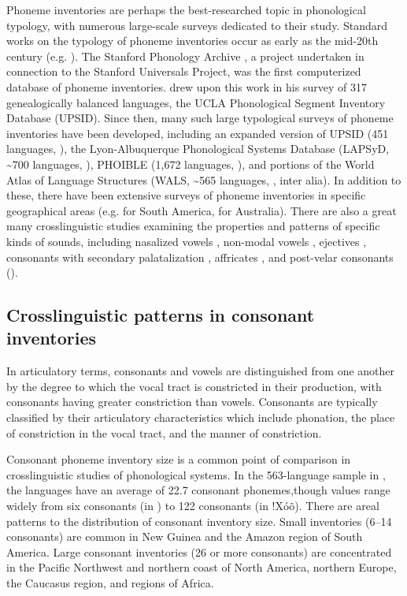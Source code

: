   Phoneme inventories are perhaps the best-researched topic in phonological typology, with numerous large-scale surveys dedicated to their study. Standard works on the typology of phoneme inventories occur as early as the mid-20th century (e.g. \citealt{Hockett1955}). The Stanford Phonology Archive \citep{CrothersEtAl1979}, a project undertaken in connection to the Stanford Universals Project, was the first computerized database of phoneme inventories. \citet{Maddieson1984} drew upon this work in his survey of 317 genealogically balanced languages, the UCLA Phonological Segment Inventory Database (UPSID). Since then, many such large typological surveys of phoneme inventories have been developed, including an expanded version of UPSID (451 languages, \citealt{MaddiesonPrecoda1992}), the Lyon-Albuquerque Phonological Systems Database (LAPSyD, {\textasciitilde}700 languages, \citealt{MaddiesonEtAl2013}), PHOIBLE (1,672 languages, \citealt{MoranEtAl2014}), and portions of the World Atlas of Language Structures (WALS, {\textasciitilde}565 languages, \citealt{Maddieson2013b,Maddieson2013c}, inter alia). In addition to these, there have been extensive surveys of phoneme inventories in specific geographical areas (e.g. \citealt{MichaelEtAl2015} for South America, \citealt{GasserBowern2014} for Australia). There are also a great many crosslinguistic studies examining the properties and patterns of specific kinds of sounds, including nasalized vowels \citep{Hajek2013}, non-modal vowels \citep{Gordon1998}, ejectives \citep{Fallon2002}, consonants with secondary palatalization \citep{Hall2000}, affricates \citep{Berns2013}, and post-velar consonants (\citealt{Sylak-Glassman2014}). 

\subsection{Crosslinguistic patterns in consonant inventories}\label{sec:4.1.1}

  In articulatory terms, consonants and vowels are distinguished from one another by the degree to which the vocal tract is constricted in their production, with consonants having greater constriction than vowels. Consonants are typically classified by their articulatory characteristics which include phonation, the place of constriction in the vocal tract, and the manner of constriction.

  Consonant phoneme inventory size is a common point of comparison in cross\-linguistic studies of phonological systems. In the 563-language sample in \citet{Maddieson2013b}, the languages have an average of 22.7 consonant phonemes,\linebreak though values range widely from six consonants (in ) to 122 consonants (in !Xóõ). There are areal patterns to the distribution of consonant inventory size. Small inventories (6--14 consonants) are common in New Guinea and the Amazon region of South America. Large consonant inventories (26 or more consonants) are concentrated in the Pacific Northwest and northern coast of North America, northern Europe, the Caucasus region, and regions of  Africa.

